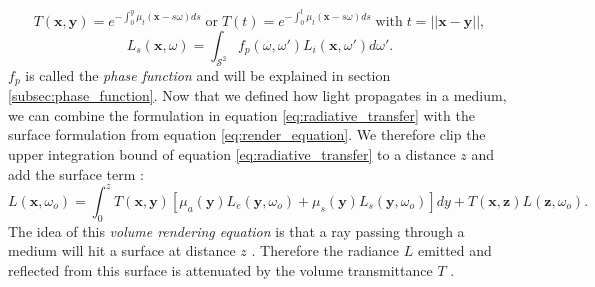 \begin{equation}
    \label{eq:beer_lambert_law}
    T(\boldsymbol{x}, \boldsymbol{y}) = e^{-\int_0^y \mu_t(\boldsymbol{x} - s\omega)ds} \;\text{or}\; T(t) = e^{-\int_0^t \mu_t(\boldsymbol{x} - s\omega)ds} \;\text{with}\; t=||\boldsymbol{x}-\boldsymbol{y}||,
\end{equation}
\begin{equation}
    \label{eq:in_scattered_radiance}
    L_s(\boldsymbol{x}, \omega) = \int_{\mathcal{S}^2} f_p(\omega, \omega')L_i(\boldsymbol{x}, \omega')d\omega'.
\end{equation}
$f_p$ is called the \textit{phase function} and will be explained in section \ref{subsec:phase_function}.
Now that we defined how light propagates in a medium, we can combine the formulation in equation \ref{eq:radiative_transfer} with the surface formulation from equation \ref{eq:render_equation}.
We therefore clip the upper integration bound of equation \ref{eq:radiative_transfer} to a distance $z$ and add the surface term \cite[p. 3]{novak_overview}:
\begin{equation}
    L(\boldsymbol{x}, \omega_o) = \int_0^z T(\boldsymbol{x}, \boldsymbol{y})[\mu_a(\boldsymbol{y})L_e(\boldsymbol{y}, \omega_o) + \mu_s(\boldsymbol{y})L_s(\boldsymbol{y}, \omega_o)]dy + T(\boldsymbol{x}, \boldsymbol{z})L(\boldsymbol{z}, \omega_o).
\end{equation}
The idea of this \textit{volume rendering equation} is that a ray passing through a medium will hit a surface at distance $z$ \cite[p. 3]{novak_overview}.
Therefore the radiance $L$ emitted and reflected from this surface is attenuated by the volume transmittance $T$ \cite[p. 889]{pbr}.

